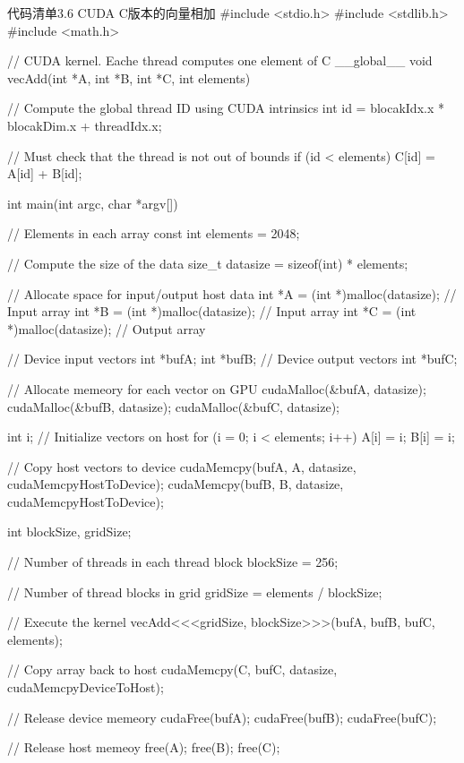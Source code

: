 \begin{codeboxt}[cpp]{代码清单3.6 CUDA C版本的向量相加}
#include <stdio.h>
#include <stdlib.h>
#include <math.h>

// CUDA kernel. Eache thread computes one element of C
__global__ void vecAdd(int *A, int *B, int *C, int elements){
  // Compute the global thread ID using CUDA intrinsics
  int id = blocakIdx.x * blocakDim.x + threadIdx.x;

  // Must check that the thread is not out of bounds
  if (id < elements)
    C[id] = A[id] + B[id];
}

int main(int argc, char *argv[]){
  // Elements in each array
  const int elements = 2048;

  // Compute the size of the data
  size_t datasize = sizeof(int) * elements;

  // Allocate space for input/output host data
  int *A = (int *)malloc(datasize); // Input array
  int *B = (int *)malloc(datasize); // Input array
  int *C = (int *)malloc(datasize); // Output array

  // Device input vectors
  int *bufA;
  int *bufB;
  // Device output vectors
  int *bufC;

  // Allocate memeory for each vector on GPU
  cudaMalloc(&bufA, datasize);
  cudaMalloc(&bufB, datasize);
  cudaMalloc(&bufC, datasize);

  int i;
  // Initialize vectors on host
  for (i = 0; i < elements; i++){
    A[i] = i;
    B[i] = i;
  }

  // Copy host vectors to device
  cudaMemcpy(bufA, A, datasize, cudaMemcpyHostToDevice);
  cudaMemcpy(bufB, B, datasize, cudaMemcpyHostToDevice);

  int blockSize, gridSize;

  // Number of threads in each thread block
  blockSize = 256;

  // Number of thread blocks in grid
  gridSize = elements / blockSize;

  // Execute the kernel
  vecAdd<<<gridSize, blockSize>>>(bufA, bufB, bufC, elements);

  // Copy array back to host
  cudaMemcpy(C, bufC, datasize, cudaMemcpyDeviceToHost);

  // Release device memeory
  cudaFree(bufA);
  cudaFree(bufB);
  cudaFree(bufC);

  // Release host memeoy
  free(A);
  free(B);
  free(C);
}
\end{codeboxt}


